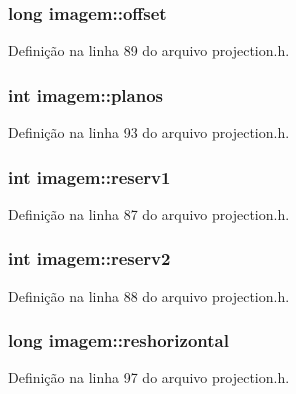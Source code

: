 \subsubsection[{offset}]{\setlength{\rightskip}{0pt plus 5cm}long imagem\+::offset}\label{structimagem_aec367505e23b56bade2b2e9dce406a8b}


Definição na linha 89 do arquivo projection.\+h.

\subsubsection[{planos}]{\setlength{\rightskip}{0pt plus 5cm}int imagem\+::planos}\label{structimagem_abeb0fe1b9f819654e55f5d8163c941d9}


Definição na linha 93 do arquivo projection.\+h.

\subsubsection[{reserv1}]{\setlength{\rightskip}{0pt plus 5cm}int imagem\+::reserv1}\label{structimagem_aaa0a7f5a5044794c12fe47eaf8a358fd}


Definição na linha 87 do arquivo projection.\+h.

\subsubsection[{reserv2}]{\setlength{\rightskip}{0pt plus 5cm}int imagem\+::reserv2}\label{structimagem_a97c0cd7e874bc711acb17bb3f34b33df}


Definição na linha 88 do arquivo projection.\+h.

\subsubsection[{reshorizontal}]{\setlength{\rightskip}{0pt plus 5cm}long imagem\+::reshorizontal}\label{structimagem_af6a91fff6f6784fd55ce0fbf566749fe}


Definição na linha 97 do arquivo projection.\+h.

